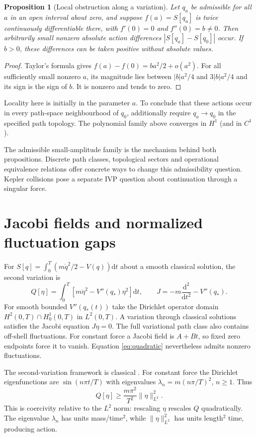\documentclass[11pt,a4paper]{article}
\newtheorem{proposition}{Proposition}
\newcommand{\dd}{\mathrm{d}}
\begin{document}
\begin{proposition}[Local obstruction along a variation]\label{prop:local}
Let $q_a$ be admissible for all $a$ in an open interval about zero, and suppose
$f(a)=S[q_a]$ is twice continuously differentiable there, with
$f'(0)=0$ and $f''(0)=b\ne0$. Then arbitrarily small nonzero absolute action
differences $|S[q_a]-S[q_0]|$ occur. If $b>0$, these differences can be taken positive
without absolute values.
\end{proposition}
\begin{proof}
Taylor's formula gives $f(a)-f(0)=b a^2/2+o(a^2)$. For all sufficiently small
nonzero $a$, its magnitude lies between $|b|a^2/4$ and $3|b|a^2/4$ and its sign
is the sign of $b$. It is nonzero and tends to zero.
\end{proof}
Locality here is initially in the parameter $a$. To conclude that these actions
occur in every path-space neighbourhood of $q_0$, additionally require
$q_a\to q_0$ in the specified path topology. The polynomial family above converges
in $H^1$ (and in $C^1$).

The admissible small-amplitude family is the mechanism behind both propositions.
Discrete path classes, topological sectors and operational equivalence relations
offer concrete ways to change this admissibility question. Kepler collisions pose
a separate IVP question about continuation through a singular force.

\section{Jacobi fields and normalized fluctuation gaps}
For $S[q]=\int_0^T(m\dot q^2/2-V(q))\dd t$ about a smooth classical solution,
the second variation is
\[
 Q[\eta]=\int_0^T\left[m\dot\eta^2-V''(q_*)\eta^2\right]\dd t,
 \qquad J=-m\frac{\dd^2}{\dd t^2}-V''(q_*).
\]
For smooth bounded $V''(q_*(t))$ take the Dirichlet operator domain
$H^2(0,T)\cap H^1_0(0,T)$ in $L^2(0,T)$. A variation through classical solutions
satisfies the Jacobi equation $J\eta=0$. The full variational path class also
contains off-shell fluctuations.
For constant force a Jacobi field is $A+Bt$, so fixed zero endpoints force it to
vanish. Equation \eqref{eq:quadratic} nevertheless admits nonzero fluctuations.

The second-variation framework is classical \cite[\S8.2]{Cristoferi2016CalculusVariations}.
For constant force the Dirichlet eigenfunctions are $\sin(n\pi t/T)$ with
eigenvalues $\lambda_n=m(n\pi/T)^2$, $n\ge1$. Thus
\[
 Q[\eta]\ge\frac{m\pi^2}{T^2}\|\eta\|_{L^2}^2.
\]
This is coercivity relative to the $L^2$ norm: rescaling $\eta$ rescales $Q$
quadratically. The eigenvalue $\lambda_n$ has units
mass/time$^2$, while $\|\eta\|_{L^2}^2$ has units length$^2$ time, producing action.
\end{document}
